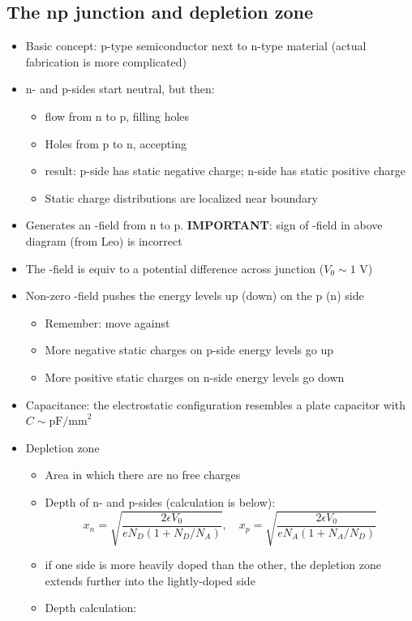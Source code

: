 \subsection{The np junction and depletion zone}
\begin{itemize}
  \item Basic concept: p-type semiconductor next to n-type material (actual fabrication is more complicated)
  \item n- and p-sides start neutral, but then:
  \begin{itemize}
    \item \el flow from n to p, filling holes
    \item Holes from p to n, accepting \el
    \item \thus result: p-side has static negative charge; n-side has static positive charge
    \item Static charge distributions are localized near boundary
  \end{itemize}
  \item Generates an \E-field from n to p. {\bf IMPORTANT}: sign of \E-field in above diagram (from Leo) is incorrect
  \item The \E-field is equiv to a potential difference across junction ($V_0 \sim 1$ V)
  \item Non-zero \E-field pushes the energy levels up (down) on the p (n) side
  \begin{itemize}
    \item Remember: \el move against \E
    \item More negative static charges on p-side \thus \el energy levels go up
    \item More positive static charges on n-side \thus \el energy levels go down
  \end{itemize}
  \item Capacitance: the electrostatic configuration resembles a plate capacitor with $C\sim \text{pF/mm}^2$
  \item Depletion zone
  \begin{itemize}
    \item Area in which there are no free charges
    \item Depth of n- and p-sides (calculation is below):
    \begin{equation}
      x_n = \sqrt{\frac{2\epsilon V_0}{e N_D(1+N_D/N_A)}}, \quad x_p = \sqrt{\frac{2\epsilon V_0}{eN_A(1+N_A/N_D)}}
    \end{equation}
    \item \thus if one side is more heavily doped than the other, the depletion zone extends further into the lightly-doped side
    \item Depth calculation:
  \end{itemize}
\end{itemize}

